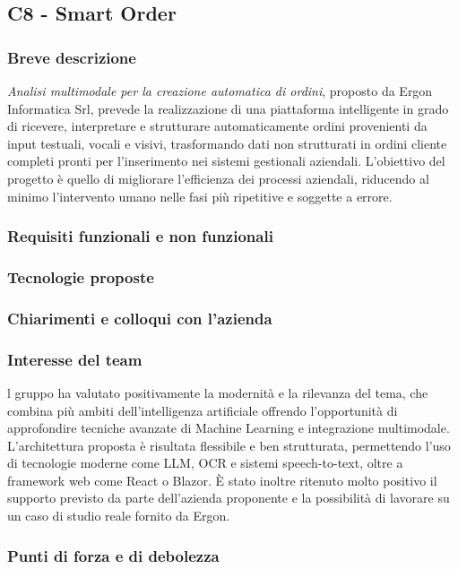 \documentclass[a4paper,11pt]{article}
\begin{document}
\subsection{C8 - Smart Order}
\subsubsection{Breve descrizione}
\parbox[h]{\linewidth}{%
\textit{Analisi multimodale per la creazione automatica di
ordini}, proposto da Ergon Informatica Srl, prevede la realizzazione di una
piattaforma intelligente in grado di ricevere, interpretare e strutturare
automaticamente ordini provenienti da input testuali, vocali e visivi, trasformando
dati non strutturati in ordini cliente completi pronti per l'inserimento nei sistemi
gestionali aziendali. L'obiettivo del progetto è quello di migliorare l'efficienza dei
processi aziendali, riducendo al minimo l'intervento umano nelle fasi più ripetitive
e soggette a errore.
}
\subsubsection{Requisiti funzionali e non funzionali}
\subsubsection{Tecnologie proposte}
\subsubsection{Chiarimenti e colloqui con l'azienda}
\subsubsection{Interesse del team}
\parbox[t]{\linewidth}{%
l gruppo ha valutato positivamente la modernità e la rilevanza del tema, che
combina più ambiti dell'intelligenza artificiale offrendo l'opportunità di
approfondire tecniche avanzate di Machine Learning e integrazione multimodale.
L'architettura proposta è risultata flessibile e ben strutturata, permettendo l'uso di
tecnologie moderne come LLM, OCR e sistemi speech-to-text, oltre a framework
web come React o Blazor. È stato inoltre ritenuto molto positivo il supporto
previsto da parte dell'azienda proponente e la possibilità di lavorare su un caso di
studio reale fornito da Ergon.
}
\subsubsection{Punti di forza e di debolezza}
\end{document}
